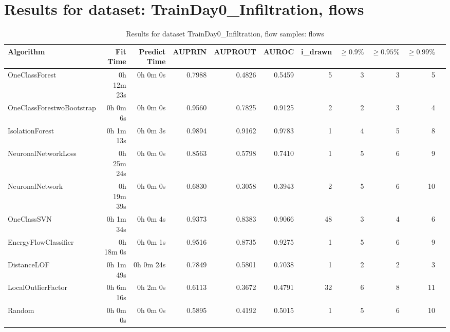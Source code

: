 \documentclass{article}
\begin{document}
\section*{Results for dataset: TrainDay0_Infiltration, flows}
\begin{table}[h!]
\centering
\caption{Results for dataset TrainDay0_Infiltration, flow samples: flows}
\begin{tabular}{lrrrrrrrrrr}
\toprule
Algorithm & Fit Time & Predict Time & AUPRIN & AUPROUT & AUROC & i\_drawn & $\geq 0.9\%$ & $\geq 0.95\%$ & $\geq 0.99\%$ \\
\midrule
OneClassForest & 0h 12m 23s & 0h 0m 0s & 0.7988 & 0.4826 & 0.5459 & 5 & 3 & 3 & 5 \\
OneClassForestwoBootstrap & 0h 0m 6s & 0h 0m 0s & 0.9560 & 0.7825 & 0.9125 & 2 & 2 & 3 & 4 \\
IsolationForest & 0h 1m 13s & 0h 0m 3s & 0.9894 & 0.9162 & 0.9783 & 1 & 4 & 5 & 8 \\
NeuronalNetworkLoss & 0h 25m 24s & 0h 0m 0s & 0.8563 & 0.5798 & 0.7410 & 1 & 5 & 6 & 9 \\
NeuronalNetwork & 0h 19m 39s & 0h 0m 0s & 0.6830 & 0.3058 & 0.3943 & 2 & 5 & 6 & 10 \\
OneClassSVN & 0h 1m 34s & 0h 0m 4s & 0.9373 & 0.8383 & 0.9066 & 48 & 3 & 4 & 6 \\
EnergyFlowClassifier & 0h 18m 0s & 0h 0m 1s & 0.9516 & 0.8735 & 0.9275 & 1 & 5 & 6 & 9 \\
DistanceLOF & 0h 1m 49s & 0h 0m 24s & 0.7849 & 0.5801 & 0.7038 & 1 & 2 & 2 & 3 \\
LocalOutlierFactor & 0h 6m 16s & 0h 2m 0s & 0.6113 & 0.3672 & 0.4791 & 32 & 6 & 8 & 11 \\
Random & 0h 0m 0s & 0h 0m 0s & 0.5895 & 0.4192 & 0.5015 & 1 & 5 & 6 & 10 \\
\bottomrule
\end{tabular}
\end{table}
\end{document}
